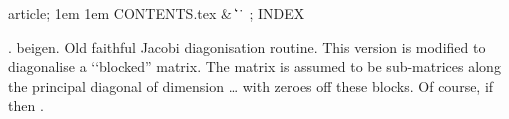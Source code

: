 


\Wbegin[;]
{article;}
{1em}
{1em}
{CONTENTS.tex}
{ %
 {\&\WRS}
 {\|}
 {\>\WUC}
 {\>\WUC}
 {\>\WUC}
 {\@}
 {\.\.}
 {\.}
 {}
}
{\M}
{;}
{INDEX}






\FWEBtoc

.  beigen. Old faithful Jacobi diagonisation routine. This version
is modified to diagonalise a \lq\lq blocked'' matrix. The matrix is
assumed to be  sub-matrices along the principal diagonal
of dimension  \ldots {} with zeroes
off these blocks. Of course, if  then .


